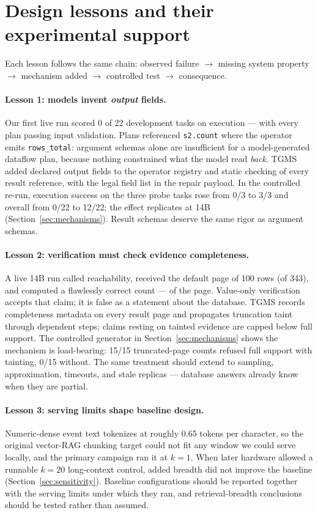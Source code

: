 \documentclass[11pt]{article}
\begin{document}
\section{Design lessons and their experimental support}
\label{sec:findings}
Each lesson follows the same chain: observed failure $\to$ missing
system property $\to$ mechanism added $\to$ controlled test $\to$
consequence.

\paragraph{Lesson 1: models invent \emph{output} fields.}
Our first live run scored 0 of 22 development tasks on execution ---
with every plan passing input validation. Plans referenced
\texttt{s2.count} where the operator emits \texttt{rows\_total}:
argument schemas alone are insufficient for a model-generated dataflow
plan, because nothing constrained what the model read \emph{back}. TGMS
added declared output fields to the operator registry and static
checking of every result reference, with the legal field list in the
repair payload. In the controlled re-run, execution success on the
three probe tasks rose from 0/3 to 3/3 and overall from 0/22 to 12/22;
the effect replicates at 14B (Section~\ref{sec:mechanisms}). Result
schemas deserve the same rigor as argument schemas.

\paragraph{Lesson 2: verification must check evidence completeness.}
A live 14B run called reachability, received the default page of 100
rows (of 343), and computed a flawlessly correct count --- of the page.
Value-only verification accepts that claim; it is false as a statement
about the database. TGMS records completeness metadata on every result
page and propagates truncation taint through dependent steps; claims
resting on tainted evidence are capped below full support. The
controlled generator in Section~\ref{sec:mechanisms} shows the
mechanism is load-bearing: 15/15 truncated-page counts refused full
support with tainting, 0/15 without. The same treatment should extend
to sampling, approximation, timeouts, and stale replicas --- database
answers already know when they are partial.

\paragraph{Lesson 3: serving limits shape baseline design.}
Numeric-dense event text tokenizes at roughly 0.65 tokens per
character, so the original vector-RAG chunking target could not fit any
window we could serve locally, and the primary campaign ran it at
$k{=}1$. When later hardware allowed a runnable $k{=}20$ long-context
control, added breadth did not improve the baseline
(Section~\ref{sec:sensitivity}). Baseline configurations should be
reported together with the serving limits under which they ran, and
retrieval-breadth conclusions should be tested rather than assumed.
\end{document}
